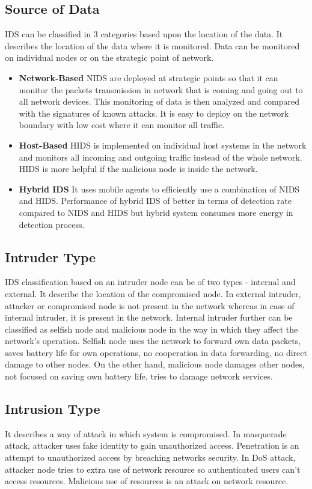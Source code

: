 \subsection{Source of Data}
IDS can be classified in 3 categories based upon the location of the data. It describes the location of the data where it is monitored. Data can be monitored on individual nodes or on the strategic point of network.
\begin{itemize}
    \item{\textbf{Network-Based} NIDS are deployed at strategic points so that it can monitor the packets transmission in network that is coming and going out to all network devices. This monitoring of data is then analyzed and compared with the signatures of known attacks. It is easy to deploy on the network boundary  with low cost where it can monitor all traffic.}
    \item{\textbf{Host-Based} HIDS is implemented on individual host systems in the network and monitors all incoming and outgoing traffic instead of the whole network. HIDS is more helpful if the malicious node is inside the network.}
    \item{\textbf{Hybrid IDS} It uses mobile agents to efficiently use a combination of NIDS and HIDS. Performance of hybrid IDS of better in terms of detection rate compared to NIDS and HIDS but hybrid system consumes more energy in detection process.}
\end{itemize}
\subsection{Intruder Type}
IDS classification based on  an intruder node can be of two types - internal and external. It describe the location of the compromised node. In external intruder, attacker or compromised node is not present in the network whereas in case of internal intruder, it is present in the network. Internal intruder further can be classified as selfish node and malicious node in the way in which they affect the network's operation. Selfish node uses the network to forward own data packets, saves battery life for own operations, no cooperation in data forwarding, no direct damage to other nodes. On the other hand, malicious node damages other nodes, not focused on saving own battery life, tries to damage network services.
\subsection{Intrusion Type}
It describes a way of attack in which system is compromised. In masquerade attack, attacker uses\textcolor{white}{.}fake identity\textcolor{white}{.}to gain unauthorized\textcolor{white}{.}access. Penetration\textcolor{white}{.}is an attempt to unauthorized access by breaching networks security. In DoS attack, attacker node tries to extra use of network resource so authenticated users can’t access resources. Malicious use of resources is an attack on network resource.

